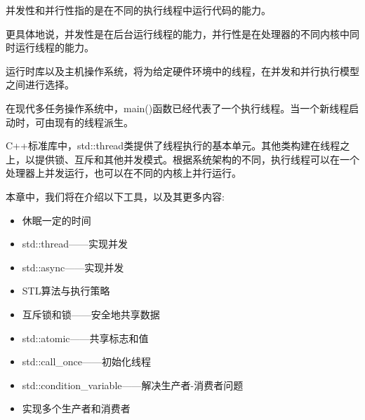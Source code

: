 并发性和并行性指的是在不同的执行线程中运行代码的能力。

更具体地说，并发性是在后台运行线程的能力，并行性是在处理器的不同内核中同时运行线程的能力。

运行时库以及主机操作系统，将为给定硬件环境中的线程，在并发和并行执行模型之间进行选择。

在现代多任务操作系统中，main()函数已经代表了一个执行线程。当一个新线程启动时，可由现有的线程派生。

C++标准库中，std::thread类提供了线程执行的基本单元。其他类构建在线程之上，以提供锁、互斥和其他并发模式。根据系统架构的不同，执行线程可以在一个处理器上并发运行，也可以在不同的内核上并行运行。


本章中，我们将在介绍以下工具，以及其更多内容:

\begin{itemize}
\item 
休眠一定的时间

\item 
std::thread——实现并发

\item 
std::async——实现并发

\item 
STL算法与执行策略

\item 
互斥锁和锁——安全地共享数据

\item 
std::atomic——共享标志和值

\item 
std::call\_once——初始化线程

\item 
std::condition\_variable——解决生产者-消费者问题

\item 
实现多个生产者和消费者
\end{itemize}
